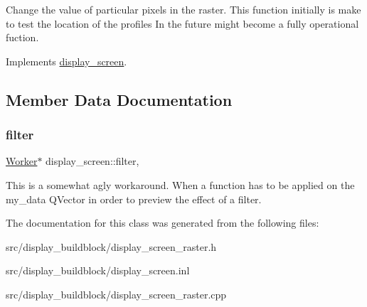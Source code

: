 Change the value of particular pixels in the raster. This function initially is make to test the location of the profiles In the future might become a fully operational fuction. 

Implements \mbox{\hyperlink{classdisplay__screen_a2788f315d8f91b4c8a2b870698ce6623}{display\+\_\+screen}}.



\subsection{Member Data Documentation}
\mbox{\label{classdisplay__screen_a54ed0638f240e4a044d9d4376233ec71}} 
\subsubsection{\texorpdfstring{filter}{filter}}
{\footnotesize\ttfamily \mbox{\hyperlink{classWorker}{Worker}}$\ast$ display\+\_\+screen\+::filter\hspace{0.3cm}{\ttfamily [protected]}, {\ttfamily [inherited]}}

This is a somewhat agly workaround. When a function has to be applied on the my\+\_\+data Q\+Vector in order to preview the effect of a filter. 

The documentation for this class was generated from the following files\+:\begin{DoxyCompactItemize}
\item 
src/display\+\_\+buildblock/display\+\_\+screen\+\_\+raster.\+h\item 
src/display\+\_\+buildblock/display\+\_\+screen.\+inl\item 
src/display\+\_\+buildblock/display\+\_\+screen\+\_\+raster.\+cpp\end{DoxyCompactItemize}

